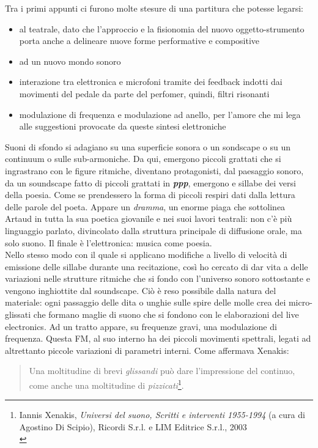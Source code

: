 Tra i primi appunti ci furono molte stesure di una partitura che potesse legarsi:
\begin{itemize}
\item{al teatrale, dato che l'approccio e la fisionomia del nuovo oggetto-strumento porta anche a delineare nuove forme performative e compositive}
\item{ad un nuovo mondo sonoro}
\item{interazione tra elettronica e microfoni tramite dei feedback indotti dai movimenti del pedale da parte del perfomer, quindi, filtri risonanti}
\item{modulazione di frequenza e modulazione ad anello, per l'amore che mi lega alle suggestioni provocate da queste sintesi elettroniche}
\end{itemize}

Suoni di sfondo si adagiano su una superficie sonora o un sondscape o su un continuum o sulle sub-armoniche. Da qui, emergono piccoli grattati che si ingrastrano con le figure ritmiche, diventano protagonisti, dal paesaggio sonoro, da un soundscape fatto di piccoli grattati in \textbf{\textit{ppp}}, emergono e sillabe dei versi della poesia. Come se prendessero la forma di piccoli respiri dati dalla lettura delle parole del poeta. Appare un \textit{dramma}, un enorme piaga che sottolinea Artaud in tutta la sua poetica giovanile e nei suoi lavori teatrali: non c'è più linguaggio parlato, divincolato dalla struttura principale di diffusione orale, ma solo suono. Il finale è l'elettronica: musica come poesia. \\
Nello stesso modo con il quale si applicano modifiche a livello di velocità di emissione delle sillabe durante una recitazione, così ho cercato di dar vita a delle variazioni nelle strutture ritmiche che si fondo con l'universo sonoro sottostante e vengono inghiottite dal soundscape. Ciò è reso possibile dalla natura del materiale: ogni passaggio delle dita o unghie sulle spire delle molle crea dei micro-glissati che formano maglie di suono che si fondono con le elaborazioni del live electronics. Ad un tratto appare, su frequenze gravi, una modulazione di frequenza. Questa FM, al suo interno ha dei piccoli movimenti spettrali, legati ad altrettanto piccole variazioni di parametri interni. Come affermava Xenakis:
\begin{quotation}
Una moltitudine di brevi \textit{glissandi} può dare l'impressione del continuo, come anche una moltitudine di \textit{pizzicati}\footnote{Iannis Xenakis, \textit{Universi del suono, Scritti e interventi 1955-1994} (a cura di Agostino Di Scipio), Ricordi S.r.l. e LIM Editrice S.r.l., 2003 \\}.
\end{quotation}

